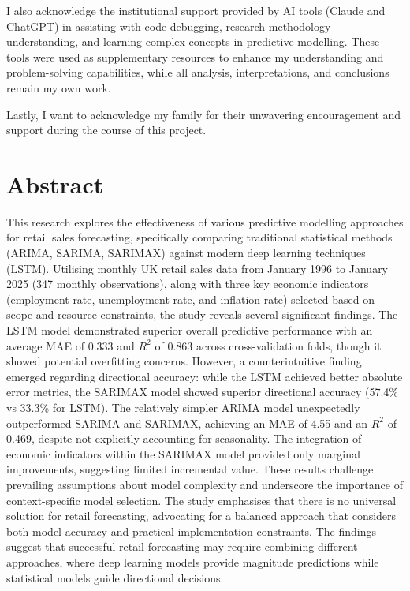 \documentclass[12pt,a4paper]{report}
\begin{document}
I also acknowledge the institutional support provided by AI tools (Claude and ChatGPT) in assisting with code debugging, research methodology understanding, and learning complex concepts in predictive modelling. These tools were used as supplementary resources to enhance my understanding and problem-solving capabilities, while all analysis, interpretations, and conclusions remain my own work.

Lastly, I want to acknowledge my family for their unwavering encouragement and support during the course of this project.

\chapter*{Abstract}
This research explores the effectiveness of various predictive modelling approaches for retail sales forecasting, specifically comparing traditional statistical methods (ARIMA, SARIMA, SARIMAX) against modern deep learning techniques (LSTM). Utilising monthly UK retail sales data from January 1996 to January 2025 (347 monthly observations), along with three key economic indicators (employment rate, unemployment rate, and inflation rate) selected based on scope and resource constraints, the study reveals several significant findings. The LSTM model demonstrated superior overall predictive performance with an average MAE of 0.333 and $R^2$ of 0.863 across cross-validation folds, though it showed potential overfitting concerns. However, a counterintuitive finding emerged regarding directional accuracy: while the LSTM achieved better absolute error metrics, the SARIMAX model showed superior directional accuracy (57.4\% vs 33.3\% for LSTM). The relatively simpler ARIMA model unexpectedly outperformed SARIMA and SARIMAX, achieving an MAE of 4.55 and an $R^2$ of 0.469, despite not explicitly accounting for seasonality. The integration of economic indicators within the SARIMAX model provided only marginal improvements, suggesting limited incremental value. These results challenge prevailing assumptions about model complexity and underscore the importance of context-specific model selection. The study emphasises that there is no universal solution for retail forecasting, advocating for a balanced approach that considers both model accuracy and practical implementation constraints. The findings suggest that successful retail forecasting may require combining different approaches, where deep learning models provide magnitude predictions while statistical models guide directional decisions.
\end{document}
